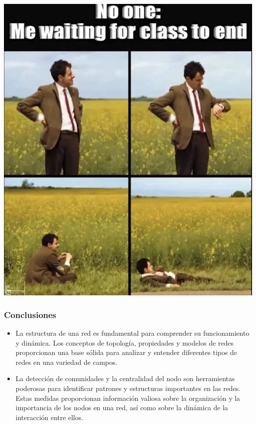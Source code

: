\documentclass[
10pt, %
aspectratio=169, %
]{beamer}
\begin{document}
	\begin{frame}
		
		\centering
		\includegraphics[height=\paperheight]{fin.png}
		
	\end{frame}

	
	\begin{frame}
		
		\frametitle{Conclusiones}
		
		\begin{itemize}
			
			\item La estructura de una red es fundamental para comprender su funcionamiento y dinámica. Los conceptos de topología, propiedades y modelos de redes proporcionan una base sólida para analizar y entender diferentes tipos de redes en una variedad de campos. \\[4mm]
			
			\item La detección de comunidades y la centralidad del nodo son herramientas poderosas para identificar patrones y estructuras importantes en las redes. Estas medidas proporcionan información valiosa sobre la organización y la importancia de los nodos en una red, así como sobre la dinámica de la interacción entre ellos.
			
		\end{itemize}
		
	\end{frame}
\end{document}
